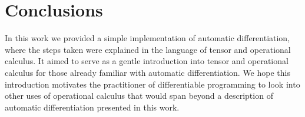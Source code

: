 \section{Conclusions}

In this work we provided a simple implementation of automatic differentiation, where the steps taken were explained in the language of tensor and operational calculus. It aimed to serve as a gentle introduction into tensor and operational calculus for those already familiar with automatic differentiation.
We hope this introduction motivates the practitioner of differentiable programming to look into other uses of operational calculus that would span beyond a description of automatic differentiation presented in this work.
